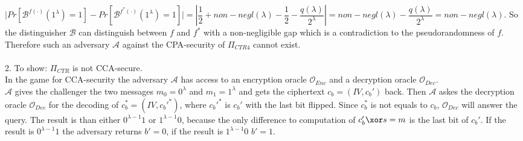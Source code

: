 \(\vert Pr[\mathcal{B}^{f(\cdot)}(1^\lambda) = 1] - Pr[\mathcal{B}^{f^*(\cdot)}(1^\lambda) = 1] \vert = \left\vert \dfrac{1}{2} + non-negl(\lambda) - \dfrac{1}{2} - \dfrac{q(\lambda)}{2^\lambda} \right\vert = non-negl(\lambda) - \dfrac{q(\lambda)}{2^\lambda} = non-negl(\lambda) \). So the distinguisher \(\mathcal{B}\) can distinguish between \(f\) and \(f^*\) with a non-negligible gap which is a contradiction to the pseudorandomness of \(f\). Therefore such an adversary \(\mathcal{A}\) against the CPA-security of \(\Pi_{CTR4}\) cannot exist.\\
\\
2. To show: \(\Pi_{CTR}\) is not CCA-secure.\\
In the game for CCA-security the adversary \(\mathcal{A}\) has access to an encryption oracle \(\mathcal{O}_{Enc}\) and a decryption oracle \(\mathcal{O}_{Dec}\). \\
\(\mathcal{A}\) gives the challenger the two messages \(m_0 = 0^\lambda\) and \(m_1 = 1^\lambda\) and gets the ciphertext \(c_b = (IV, c_b')\) back. Then \(\mathcal{A}\) askes the decryption oracle \(\mathcal{O}_{Dec}\) for the decoding of \(c_b^* = (IV, c_b'^*)\), where \(c_b'^*\) is \(c_b'\) with the last bit flipped. Since \(c_b^*\) is not equals to \(c_b\), \(\mathcal{O}_{Dec}\) will answer the query. The result is than either \(0^{\lambda -1}1\) or \(1^{\lambda-1}0\), because the only difference to computation of \(c_b' \xor s = m\) is the last bit of \(c_b'\).
If the result is \(0^{\lambda -1}1\) the adversary returns \(b' = 0\), if the result is \(1^{\lambda-1}0\) \(b' = 1\). 

